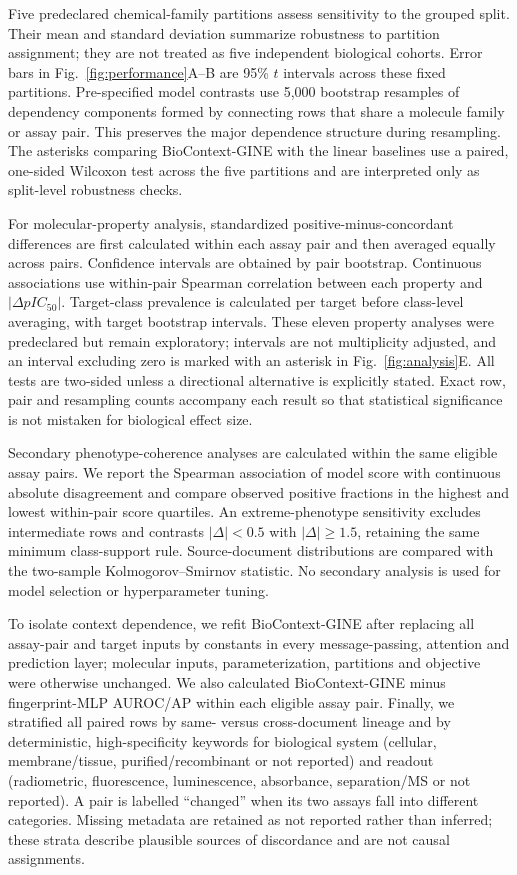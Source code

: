 \documentclass[letterpaper]{article}
\begin{document}
Five predeclared chemical-family partitions assess sensitivity to the grouped split. Their mean and standard deviation summarize robustness to partition assignment; they are not treated as five independent biological cohorts. Error bars in Fig.~\ref{fig:performance}A--B are 95\% $t$ intervals across these fixed partitions. Pre-specified model contrasts use 5,000 bootstrap resamples of dependency components formed by connecting rows that share a molecule family or assay pair. This preserves the major dependence structure during resampling. The asterisks comparing BioContext-GINE with the linear baselines use a paired, one-sided Wilcoxon test across the five partitions and are interpreted only as split-level robustness checks.

For molecular-property analysis, standardized positive-minus-concordant differences are first calculated within each assay pair and then averaged equally across pairs. Confidence intervals are obtained by pair bootstrap. Continuous associations use within-pair Spearman correlation between each property and $|\Delta pIC_{50}|$. Target-class prevalence is calculated per target before class-level averaging, with target bootstrap intervals. These eleven property analyses were predeclared but remain exploratory; intervals are not multiplicity adjusted, and an interval excluding zero is marked with an asterisk in Fig.~\ref{fig:analysis}E. All tests are two-sided unless a directional alternative is explicitly stated. Exact row, pair and resampling counts accompany each result so that statistical significance is not mistaken for biological effect size.

Secondary phenotype-coherence analyses are calculated within the same eligible assay pairs. We report the Spearman association of model score with continuous absolute disagreement and compare observed positive fractions in the highest and lowest within-pair score quartiles. An extreme-phenotype sensitivity excludes intermediate rows and contrasts $|\Delta|<0.5$ with $|\Delta|\geq1.5$, retaining the same minimum class-support rule. Source-document distributions are compared with the two-sample Kolmogorov--Smirnov statistic. No secondary analysis is used for model selection or hyperparameter tuning.

To isolate context dependence, we refit BioContext-GINE after replacing all assay-pair and target inputs by constants in every message-passing, attention and prediction layer; molecular inputs, parameterization, partitions and objective were otherwise unchanged. We also calculated BioContext-GINE minus fingerprint-MLP AUROC/AP within each eligible assay pair. Finally, we stratified all paired rows by same- versus cross-document lineage and by deterministic, high-specificity keywords for biological system (cellular, membrane/tissue, purified/recombinant or not reported) and readout (radiometric, fluorescence, luminescence, absorbance, separation/MS or not reported). A pair is labelled ``changed'' when its two assays fall into different categories. Missing metadata are retained as not reported rather than inferred; these strata describe plausible sources of discordance and are not causal assignments.
\end{document}
